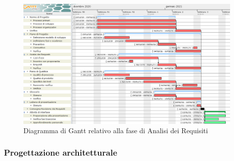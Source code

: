\begin{figure}[H]
	\centering
	\includegraphics[scale=0.45]{res/images/02_gantt_analisi_requisiti.png}
	\caption{Diagramma di Gantt relativo alla fase di Analisi dei Requisiti}
\end{figure}


\subsubsection{Progettazione architetturale}

